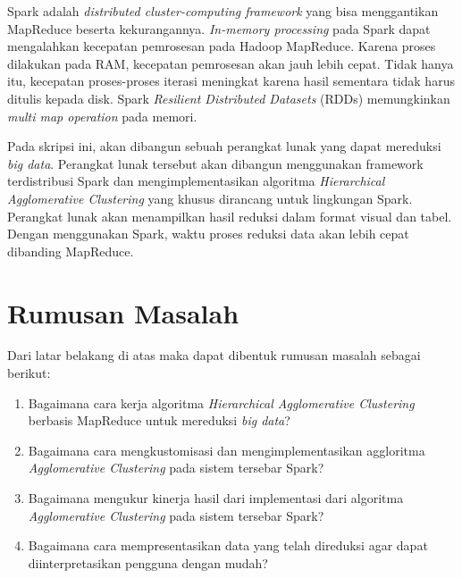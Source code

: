 Spark adalah {\it distributed cluster-computing framework} yang bisa menggantikan MapReduce beserta kekurangannya. {\it In-memory processing} pada Spark dapat mengalahkan kecepatan pemrosesan pada Hadoop MapReduce. Karena proses dilakukan pada RAM, kecepatan pemrosesan akan jauh lebih cepat. Tidak hanya itu, kecepatan proses-proses iterasi meningkat karena  hasil sementara tidak harus ditulis kepada disk. Spark {\it Resilient Distributed Datasets} (RDDs) memungkinkan {\it multi map operation} pada memori.

Pada skripsi ini, akan dibangun sebuah perangkat lunak yang dapat mereduksi {\it big data}. Perangkat lunak tersebut akan dibangun menggunakan framework terdistribusi Spark dan mengimplementasikan algoritma {\it Hierarchical Agglomerative Clustering} yang khusus dirancang untuk lingkungan Spark. Perangkat lunak akan menampilkan hasil reduksi dalam format visual dan tabel. Dengan menggunakan Spark, waktu proses reduksi data akan lebih cepat dibanding MapReduce.




\section{Rumusan Masalah}
\label{sec:rumusan}
Dari latar belakang di atas maka dapat dibentuk rumusan masalah sebagai berikut:
\begin{enumerate}

\item Bagaimana cara kerja algoritma {\it Hierarchical Agglomerative Clustering} berbasis MapReduce untuk mereduksi {\it big data}?

\item Bagaimana cara mengkustomisasi dan mengimplementasikan aggloritma {\it Agglomerative Clustering} pada sistem tersebar Spark?

\item Bagaimana mengukur kinerja hasil dari implementasi dari algoritma {\it Agglomerative Clustering} pada sistem tersebar Spark?

\item Bagaimana cara mempresentasikan data yang telah direduksi agar dapat diinterpretasikan pengguna dengan mudah?

\end{enumerate}




